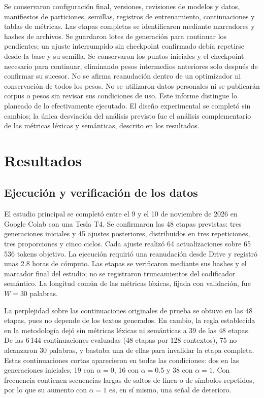 \documentclass[12pt,letterpaper]{article}
\begin{document}
Se conservaron configuración final, versiones, revisiones de modelos y
datos, manifiestos de particiones, semillas, registros de entrenamiento,
continuaciones y tablas de métricas. Las etapas completas se identificaron
mediante marcadores y hashes de archivos. Se guardaron lotes de generación
para continuar los pendientes; un ajuste interrumpido sin checkpoint
confirmado debía repetirse desde la base y su semilla. Se conservaron los
puntos iniciales y el checkpoint necesario para continuar, eliminando pesos
intermedios anteriores solo después de confirmar su sucesor. No se afirma
reanudación dentro de un optimizador ni conservación de todos los pesos.
No se utilizaron datos personales ni se publicarán corpus o pesos sin
revisar sus condiciones de uso. Este informe distingue lo planeado de lo
efectivamente ejecutado. El diseño experimental se completó sin cambios;
la única desviación del análisis previsto fue el análisis complementario
de las métricas léxicas y semánticas, descrito en los resultados.

\section{Resultados}

\subsection{Ejecución y verificación de los datos}

El estudio principal se completó entre el 9 y el 10 de noviembre de 2026
en Google Colab con una Tesla T4. Se confirmaron las 48 etapas previstas:
tres generaciones iniciales y 45 ajustes posteriores, distribuidos en tres
repeticiones, tres proporciones y cinco ciclos. Cada ajuste realizó 64
actualizaciones sobre 65\,536 tokens objetivo. La ejecución requirió una
reanudación desde Drive y registró unas 2.8 horas de cómputo. Las etapas
se verificaron mediante sus hashes y el marcador final del estudio; no
se registraron truncamientos del codificador semántico. La longitud común
de las métricas léxicas, fijada con validación, fue \(W=30\) palabras.

La perplejidad sobre las continuaciones originales de prueba se obtuvo en
las 48 etapas, pues no depende de los textos generados. En cambio, la regla
establecida en la metodología dejó sin métricas léxicas ni semánticas a 39
de las 48 etapas. De las 6\,144 continuaciones evaluadas (48 etapas por 128
contextos), 75 no alcanzaron 30 palabras, y bastaba una de ellas para
invalidar la etapa completa. Estas continuaciones cortas aparecieron en
todas las condiciones: dos en las generaciones iniciales, 19 con
\(\alpha=0\), 16 con \(\alpha=0.5\) y 38 con \(\alpha=1\). Con frecuencia
contienen secuencias largas de saltos de línea o de símbolos repetidos, por
lo que su aumento con \(\alpha=1\) es, en sí mismo, una señal de deterioro.
\end{document}
